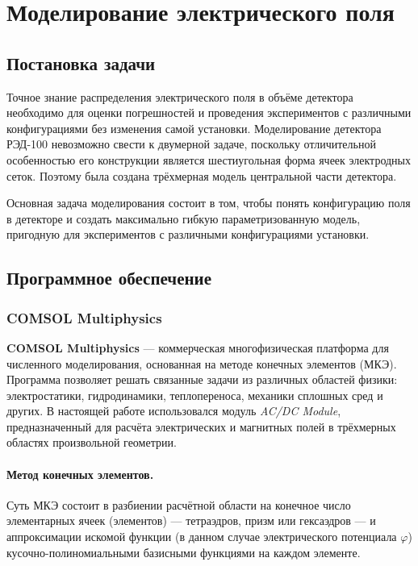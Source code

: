 \documentclass[12pt]{article}
\begin{document}
\newpage
\section{Моделирование электрического поля}

\subsection{Постановка задачи}

Точное знание распределения электрического поля в объёме детектора
необходимо для оценки погрешностей и проведения экспериментов с различными
конфигурациями без изменения самой установки. Моделирование детектора
РЭД-100 невозможно свести к двумерной задаче, поскольку отличительной
особенностью его конструкции является шестиугольная форма ячеек
электродных сеток. Поэтому была создана трёхмерная модель центральной
части детектора.

Основная задача моделирования состоит в том, чтобы понять конфигурацию
поля в детекторе и создать максимально гибкую параметризованную модель,
пригодную для экспериментов с различными конфигурациями установки.

\subsection{Программное обеспечение}

\subsubsection*{COMSOL Multiphysics}

\textbf{COMSOL Multiphysics} --- коммерческая многофизическая
платформа для численного моделирования, основанная на методе конечных
элементов (МКЭ). Программа позволяет решать связанные задачи из различных
областей физики: электростатики, гидродинамики, теплопереноса, механики
сплошных сред и других. В настоящей работе использовался модуль
\textit{AC/DC Module}, предназначенный для расчёта электрических и
магнитных полей в трёхмерных областях произвольной геометрии.

\paragraph{Метод конечных элементов.}
Суть МКЭ состоит в разбиении расчётной области на конечное число
элементарных ячеек (элементов) --- тетраэдров, призм или гексаэдров ---
и аппроксимации искомой функции (в данном случае электрического потенциала
$\varphi$) кусочно-полиномиальными базисными функциями на каждом элементе.
\end{document}

